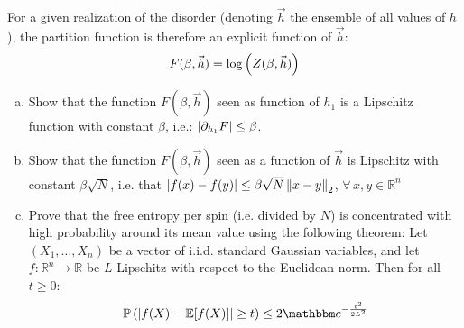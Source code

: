 \documentclass[a4paper,oneside,12pt]{article}
\begin{document}
For a given realization of the disorder (denoting $ \vec{h} $ the ensemble of all values of $ h $), the partition function is therefore an explicit function of $ \vec{h} $:
\begin{equation*}
    F(\beta, \vec{h}) = \log \left(  Z(\beta, \vec{h})  \right)
\end{equation*}
\begin{enumerate}[(a)]
\item 
        Show that the function $ F(\beta,\vec{h}) $ seen as function of $ h_1 $ is a Lipschitz function with constant $ \beta $, i.e.: $ \left| \partial_{h_1} F \right| \le \beta $.
\item 
        Show that the function $ F(\beta,\vec{h}) $ seen as a function of $ \vec{h} $ is Lipschitz with constant $ \beta \sqrt{N} $, i.e. that $ \left| f(x) - f(y) \right| \le \beta \sqrt{N} \left\| x-y \right\|_2 $, $ \forall\, x, y \in \mathbb{R}^n $
\item 
        Prove that the free entropy per spin (i.e. divided by $ N $) is concentrated with high probability around its mean value using the following theorem:
        Let $ (X_1,\ldots,X_n) $ be a vector of i.i.d. standard Gaussian variables, and let $ f \colon \mathbb{R}^n \to \mathbb{R} $ be $ L $-Lipschitz with respect to the Euclidean norm. 
        Then for all $ t \ge 0 $:
        \begin{equation*}
            \mathbb{P} \rdbrs{ \abs{f(X) - \mathbb{E}[f(X)]} \ge t } \le 2 \ee^{-\frac{t^2}{2L^2}}
        \end{equation*}
\end{enumerate}
\end{document}
